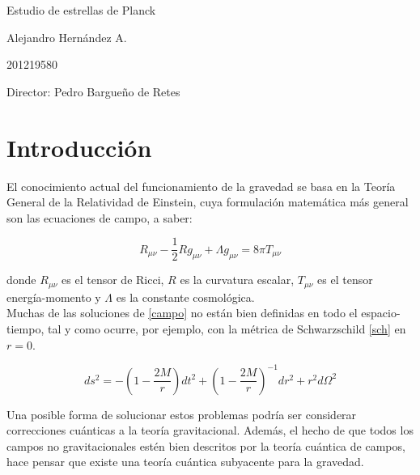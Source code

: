 \documentclass[prb,aps,preprintnumbers,amsmath,amssymb]{article}
\begin{document}
\begin{center}
\Huge
Estudio de estrellas de Planck 

\vspace{3mm}
\Large Alejandro Hern\'andez A.

\large
201219580


\vspace{2mm}
\Large
Director: Pedro Bargue\~no de Retes

\normalsize
\vspace{2mm}

\date{}
\end{center}


\normalsize
\section{Introducci\'on}


El conocimiento actual del funcionamiento de la gravedad se basa en la Teor\'ia General de la Relatividad de Einstein, cuya formulaci\'on matem\'atica m\'as general son las ecuaciones de campo, a saber:

\begin{equation}
\label{campo}
R_{\mu \nu} - \frac{1}{2} R g_{\mu \nu} + \Lambda g_{\mu \nu} = 8 \pi T_{\mu \nu}
\end{equation}

donde $R_{\mu \nu}$ es el tensor de Ricci, $R$ es la curvatura escalar, $T_{\mu \nu}$ es el tensor energ\'ia-momento y $\Lambda$ es la constante cosmol\'ogica.\\

Muchas de las soluciones de \eqref{campo} no est\'an bien definidas en todo el espacio-tiempo, tal y como ocurre, por ejemplo, con la m\'etrica de Schwarzschild \eqref{sch}  en $r = 0$.

\begin{equation}
\label{sch}
ds^2 = -\left( 1 - \frac{2M}{r} \right) dt^2 + \left( 1 - \frac{2M}{r} \right)^{-1} dr^2 + r^2d\Omega ^2
\end{equation}

Una posible forma de solucionar estos problemas podr\'ia ser considerar correcciones cu\'anticas a la teor\'ia gravitacional. Adem\'as, el hecho de que todos los campos no gravitacionales est\'en bien descritos por la teor\'ia cu\'antica de campos, hace pensar que existe una teor\'ia cu\'antica subyacente para la gravedad.\\ 
\end{document}
